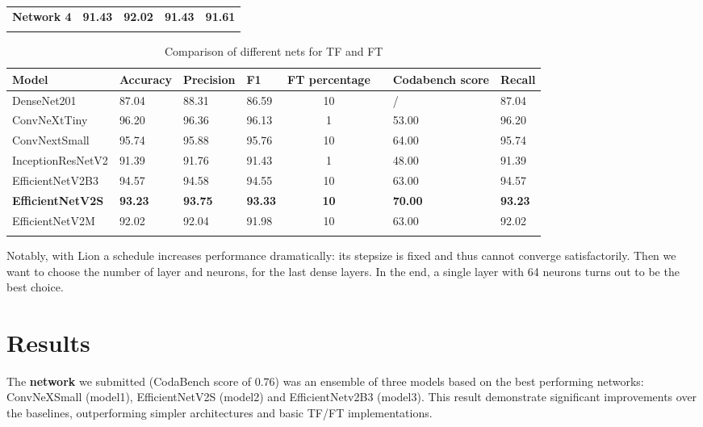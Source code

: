 \documentclass[11pt]{template}
\begin{document}
\begin{multicols}{2}
\begin{table}[ht]
\begin{tabularx}{\textwidth}{lYYYc}
    \textbf{Network 4} & \textbf{91.43} & \textbf{92.02} & \textbf{91.43} & \textbf{91.61} \\
    \bottomrule
\end{tabularx}
\label{tab:1}
\FloatBarrier
\end{table}
\begin{table}[ht]
\centering
\setlength{\tabcolsep}{3pt}
\caption{Comparison of different nets for TF and FT}
\begin{tabularx}{\textwidth}{lYYYc}
    \toprule
    Model & Accuracy  & Precision & F1 & FT percentage & & Codabench score & Recall \\
    \midrule
    DenseNet201 &  87.04 & 88.31    &   86.59 & 10    &&   / & 87.04   \\
    \hline
    ConvNeXtTiny   &  96.20    &   96.36     &   96.13    &   1 &  & 53.00    &   96.20\\
    \hline
    ConvNextSmall &  95.74 & 95.88    &   95.76 & 10    &&   64.00 & 95.74   \\
    \hline
    InceptionResNetV2 &  91.39 & 91.76    &   91.43 & 1    &&   48.00 & 91.39   \\
    \hline
    EfficientNetV2B3 &  94.57 & 94.58    &   94.55 & 10    &&   63.00 & 94.57 \\
    \hline
    \textbf{EfficientNetV2S} &  \textbf{93.23}    &   \textbf{93.75}     &   \textbf{93.33}    &    \textbf{10} &&   \textbf{70.00}    &   \textbf{93.23}\\
    \hline
    EfficientNetV2M  & 92.02 & 92.04  & 91.98  & 10    &&   63.00 & 92.02  \\
    \bottomrule
\end{tabularx}
\label{tab:2}
\end{table}
\noindent Notably, with Lion a schedule increases performance dramatically: its stepsize is fixed and thus cannot converge satisfactorily.
Then we want to choose the number of layer and neurons, for the last dense layers. In the end, a single layer with 64 neurons turns out to be the best choice.
\section{Results}
The \textbf{network} we submitted (CodaBench score of $0.76$) was an ensemble of three models based on the best performing networks: ConvNeXSmall (model1), EfficientNetV2S (model2) and EfficientNetv2B3 (model3). This result demonstrate significant improvements over the baselines, outperforming simpler architectures and basic TF/FT implementations.

\end{multicols}
\end{document}
